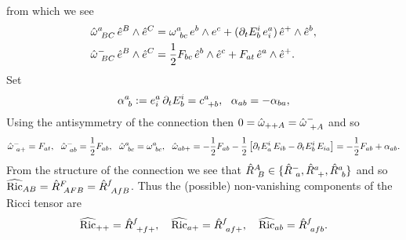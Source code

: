 \documentclass{article}
\begin{document}
from which we see
\begin{align*}
\hat \omega\sp{a}_{\ B C}\, {\hat e}\sp{B}\wedge {\hat e}\sp{C}&=
\omega\sp{a}_{\ bc}\, e\sp{b}\wedge e\sp{c}+(\partial_t E\sp{i}_b\, { e}\sp{a}_{i} )\,  {\hat e}\sp{+}\wedge
{\hat e}\sp{b},\\
\hat \omega\sp{-}_{\ B C}\, {\hat e}\sp{B}\wedge {\hat e}\sp{C}&=
\frac12 F_{bc}\, {\hat e}\sp{b}\wedge {\hat e}\sp{c} +F_{at}\, {\hat e}\sp{a}\wedge {\hat e}\sp{+}.
\end{align*}
Set
$$\alpha\sp{a}_{\ b}:= { e}\sp{a}_{i} \,\partial_t E\sp{i}_b=c\sp{a}_{\ +b},\ \
\alpha_{ab}=-\alpha_{ba}, $$
Using the antisymmetry of the connection then $0=\hat\omega_{++A}=\hat\omega\sp{-}_{\ +A}$
and so
$$\hat\omega\sp{-}_{\ a+}= F_{at},\ \  \hat\omega\sp{-}_{\ ab}= \frac12 F_{ab},\ \
\hat\omega\sp{a}_{\ bc}=\omega\sp{a}_{\ bc}, \ \
\hat\omega_{a b+}=-\frac12 F_{a b} -\frac12\left[ \partial_t E\sp{i}_a \,E_{ib}
-  \partial_t E\sp{i}_b \,E_{ia}  \right]=-\frac12 F_{a b}+\alpha_{ab}.
$$
From the structure of the connection we see that $\hat R\sp{A}_{\ B}\in\{\hat R\sp{-}_{\ a}, 
\hat R\sp{a}_{\ +}, \hat R\sp{a}_{\ b} \}$ and so $\widehat {\operatorname{Ric}}_{AB}=\hat R\sp{F}_{\ AFB}=
\hat R\sp{f}_{\ AfB}$. Thus the (possible) non-vanishing components of the Ricci tensor
are
$$\widehat {\operatorname{Ric}}_{++}=\hat R\sp{f}_{\ +f+},\quad 
\widehat {\operatorname{Ric}}_{a+}=\hat R\sp{f}_{\ af+},\quad 
\widehat {\operatorname{Ric}}_{ab}=\hat R\sp{f}_{\ afb}.
$$
\end{document}
